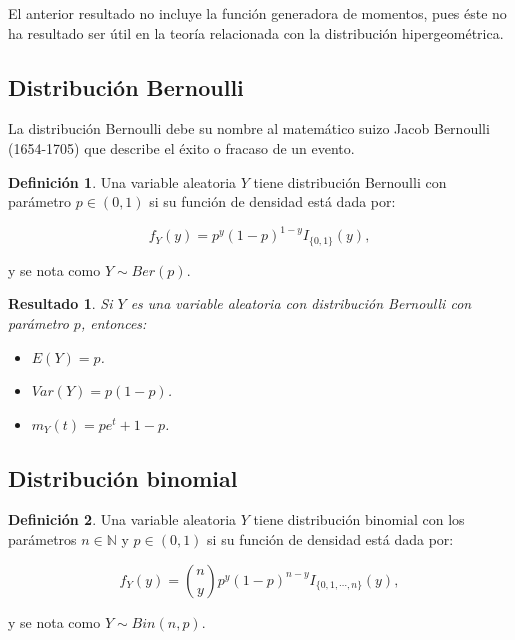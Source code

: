 \documentclass[
  10pt,
  spanish,
]{book}
\providecommand{\tightlist}{%
  \setlength{\itemsep}{0pt}\setlength{\parskip}{0pt}}
\newtheorem{proposition}{Resultado}[chapter]
\theoremstyle{definition}
\newtheorem{definition}{Definición}[chapter]
\theoremstyle{definition}
\theoremstyle{definition}
\theoremstyle{definition}
\theoremstyle{remark}
\begin{document}
El anterior resultado no incluye la función generadora de momentos, pues éste no ha resultado ser útil en la teoría relacionada con la distribución hipergeométrica.

\hypertarget{distribuciuxf3n-bernoulli}{%
\subsection{Distribución Bernoulli}\label{distribuciuxf3n-bernoulli}}

La distribución Bernoulli debe su nombre al matemático suizo Jacob Bernoulli (1654-1705) que describe el éxito o fracaso de un evento.

\begin{definition}
\protect\hypertarget{def:unnamed-chunk-5}{}{\label{def:unnamed-chunk-5} }Una variable aleatoria \(Y\) tiene distribución Bernoulli con parámetro \(p\in (0,1)\) si su función de densidad está dada por:

\begin{equation}
f_Y(y)=p^y(1-p)^{1-y}I_{\{0,1\}}(y),
\end{equation}

y se nota como \(Y\sim Ber(p)\).
\end{definition}

\begin{proposition}
\protect\hypertarget{prp:unnamed-chunk-6}{}{\label{prp:unnamed-chunk-6} }Si \(Y\) es una variable aleatoria con distribución Bernoulli con parámetro \(p\), entonces:

\begin{itemize}
\tightlist
\item
  \(E(Y)=p\).
\item
  \(Var(Y)=p(1-p)\).
\item
  \(m_Y(t)=pe^t+1-p\).
\end{itemize}
\end{proposition}

\hypertarget{distribuciuxf3n-binomial}{%
\subsection{Distribución binomial}\label{distribuciuxf3n-binomial}}

\begin{definition}
\protect\hypertarget{def:unnamed-chunk-7}{}{\label{def:unnamed-chunk-7} }Una variable aleatoria \(Y\) tiene distribución binomial con los parámetros \(n\in \mathbb{N}\) y \(p\in (0,1)\) si su función de densidad está dada por:

\begin{equation}
f_Y(y)=\binom{n}{y}p^y(1-p)^{n-y}I_{\{0,1,\cdots,n\}}(y),
\end{equation}

y se nota como \(Y\sim Bin(n,p)\).
\end{definition}
\end{document}
